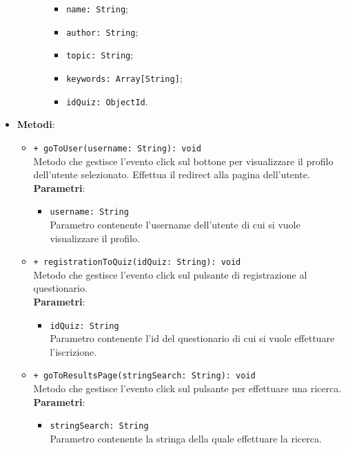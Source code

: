 \begin{itemize}
\begin{itemize}
\begin{itemize}
\begin{itemize}
					\item \texttt{name: String};
					\item \texttt{author: String};
					\item \texttt{topic: String};
					\item \texttt{keywords: Array[String]};
					\item \texttt{idQuiz: ObjectId}.
				\end{itemize}
			\end{itemize}
		\end{itemize}
		\item \textbf{Metodi}: 
		\begin{itemize}
				\item \texttt{+ goToUser(username: String): void} \\
				Metodo che gestisce l’evento click sul bottone per visualizzare il profilo dell'utente selezionato. Effettua il redirect alla pagina dell'utente.\\
				\textbf{Parametri}:
				\begin{itemize}
					\item \texttt{username: String} \\
					Parametro contenente l'username dell'utente di cui si vuole visualizzare il profilo.
				\end{itemize} 
				\item \texttt{+ registrationToQuiz(idQuiz: String): void} \\
				Metodo che gestisce l’evento click sul pulsante di registrazione al questionario.\\
				\textbf{Parametri}:
				\begin{itemize}
					\item \texttt{idQuiz: String} \\
					Parametro contenente l'id del questionario di cui si vuole effettuare l'iscrizione.
				\end{itemize} 
				\item \texttt{+ goToResultsPage(stringSearch: String): void} \\
				Metodo che gestisce l’evento click sul pulsante per effettuare una ricerca.\\
				\textbf{Parametri}:
				\begin{itemize}
					\item \texttt{stringSearch: String} \\
					Parametro contenente la stringa della quale effettuare la ricerca.
				\end{itemize} 
		\end{itemize}
	\end{itemize}

	